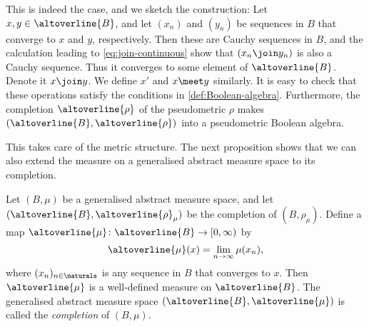 \documentclass[article, a4paper, 11pt, oneside]{memoir}
\numberwithin{equation}{chapter}
\begin{document}
This is indeed the case, and we sketch the construction: Let $x,y \in \altoverline{B}$, and let $(x_n)$ and $(y_n)$ be sequences in $B$ that converge to $x$ and $y$, respectively. Then these are Cauchy sequences in $B$, and the calculation leading to \eqref{eq:join-continuous} show that $(x_n \join y_n)$ is also a Cauchy sequence. Thus it converges to some element of $\altoverline{B}$. Denote it $x \join y$. We define $x'$ and $x \meet y$ similarly. It is easy to check that these operations satisfy the conditions in \cref{def:Boolean-algebra}. Furthermore, the completion $\altoverline{\rho}$ of the pseudometric $\rho$ makes $(\altoverline{B}, \altoverline{\rho})$ into a pseudometric Boolean algebra.

This takes care of the metric structure. The next proposition shows that we can also extend the measure on a generalised abstract measure space to its completion.

\begin{proposition}
    Let $(B,\mu)$ be a generalised abstract measure space, and let $(\altoverline{B}, \altoverline{\rho}_\mu)$ be the completion of $(B,\rho_\mu)$. Define a map $\altoverline{\mu} \colon \altoverline{B} \to [0,\infty)$ by
    \begin{equation}
        \label{eq:mu-overline-def}
        \altoverline{\mu}(x) = \lim_{n\to\infty} \mu(x_n),
    \end{equation}
    where $(x_n)_{n\in\naturals}$ is any sequence in $B$ that converges to $x$. Then $\altoverline{\mu}$ is a well-defined measure on $\altoverline{B}$. The generalised abstract measure space $(\altoverline{B}, \altoverline{\mu})$ is called the \emph{completion} of $(B,\mu)$.
\end{proposition}
\end{document}

